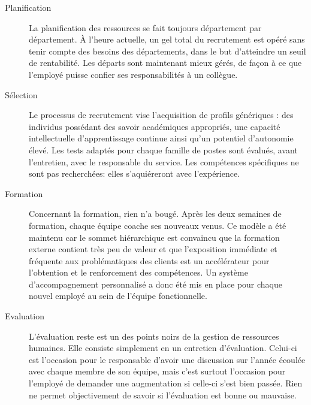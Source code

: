 \begin{description}
  \item[Planification] La planification des ressources se fait toujours département par département. À l'heure actuelle, un gel total du recrutement est opéré sans tenir compte des besoins des départements, dans le but d'atteindre un seuil de rentabilité. Les départs sont maintenant mieux gérés, de façon à ce que l'employé puisse confier ses responsabilités à un collègue.
  \item[Sélection] Le processus de recrutement vise l’acquisition de profils génériques : des individus possédant des savoir académiques appropriés, une capacité intellectuelle d’apprentissage continue ainsi qu'un potentiel d’autonomie élevé. Les tests adaptés pour chaque famille de postes sont évalués, avant l'entretien, avec le responsable du service. Les compétences spécifiques ne sont pas recherchées: elles s'aquiéreront avec l'expérience. 
  
  \item[Formation] Concernant la formation, rien n'a bougé. Après les deux semaines de formation, chaque équipe coache ses nouveaux venus. Ce modèle a été maintenu car le sommet hiérarchique est convaincu que la formation externe contient très peu de valeur et que l’exposition immédiate et fréquente aux problématiques des clients est un accélérateur pour l’obtention et le renforcement des compétences. Un système d’accompagnement personnalisé a donc été mis en place pour chaque nouvel employé au sein de l'équipe fonctionnelle. 
  \item[Evaluation] L'évaluation reste est un des points noirs de la gestion de ressources humaines. Elle consiste simplement en un entretien d'évaluation. Celui-ci est l'occasion pour le responsable d'avoir une discussion sur l'année écoulée avec chaque membre de son équipe, mais c'est surtout l'occasion pour l'employé de demander une augmentation si celle-ci s'est bien passée. Rien ne permet objectivement de savoir si l'évaluation est bonne ou mauvaise. 
  

\end{description}
